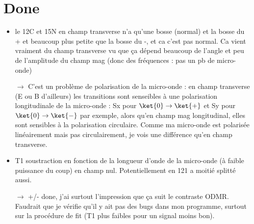 \documentclass[a4paper]{report}
\begin{document}
 \section{Done}
 \begin{itemize}
  \item le 12C et 15N en champ transverse n'a qu'une bosse (normal) et la bosse du + et beaucoup plus petite que la bosse du -, et ca c'est pas normal. Ca vient vraiment du champ transverse vu que ça dépend beaucoup de l'angle et peu de l'amplitude du champ mag (donc des fréquences : pas un pb de micro-onde)
  
  $\to$ C'est un problème de polarisation de la micro-onde : en champ transverse (E ou B d'ailleurs) les transitions sont senseibles à une polarisation longitudinale de la micro-onde : Sx pour $\ket{0} \to \ket{+}$ et Sy pour $\ket{0} \to \ket{-}$ par exemple, alors qu'en champ mag longitudinal, elles sont sensibles à la polarisation circulaire. Comme ma micro-onde est polarisée linéairement mais pas circulairement, je vois une différence qu'en champ transverse.
  
   \item T1 soustraction en fonction de la longueur d'onde de la micro-onde (à faible puissance du coup) en champ nul. Potentiellement en 121 a moitié splitté aussi.
   
   $\to$ +/- done, j'ai surtout l'impression que ça suit le contraste ODMR. Faudrait que je vérifie qu'il y ait pas des bugs dans mon programme, surtout sur la procédure de fit (T1 plus faibles pour un signal moins bon).
 \end{itemize}
  
\end{document}
